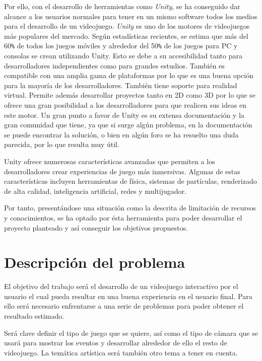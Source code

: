Por ello, con el desarrollo de herramientas como \textit{Unity}, se ha conseguido dar alcance a los usuarios normales para tener en un mismo software todos los medios para el desarrollo de un videojuego. \textit{Unity}  es uno de los motores de videojuegos más populares del mercado. Según estadísticas recientes, se estima que más del 60\verb|%| de todos los juegos móviles y alrededor del 50\verb|%| de los juegos para PC y consolas se crean utilizando Unity. Esto se debe a su accesibilidad tanto para desarrolladores independientes como para grandes estudios. También es compatible con una amplia gama de plataformas por lo que es una buena opción para la mayoría de los desarrolladores. También tiene soporte para realidad virtual. Permite además desarrollar proyectos tanto en 2D como 3D por lo que se ofrece una gran posibilidad a los desarrolladores para que realicen sus ideas en este motor. Un gran punto a favor de Unity es su extensa documentación y la gran comunidad que tiene, ya que si surge algún problema, en la documentación se puede encontrar la solución, o bien en algún foro se ha resuelto una duda parecida, por lo que resulta muy útil.

Unity ofrece numerosas características avanzadas que permiten a los desarrolladores crear experiencias de juego más inmersivas. Algunas de estas características incluyen herramientas de física, sistemas de partículas, renderizado de alta calidad, inteligencia artificial, redes y multijugador.

Por tanto, presentándose una situación como la descrita de limitación de recursos y conocimientos, se ha optado por ésta herramienta para poder desarrollar el proyecto planteado y así conseguir los objetivos propuestos.

\section{Descripción del problema}

El objetivo del trabajo será el desarrollo de un videojuego interactivo por el usuario el cual pueda resultar en una buena experiencia en el usuario final. Para ello será necesario enfrentarse a una serie de problemas para poder obtener el resultado estimado.

Será clave definir el tipo de juego que se quiere, así como el tipo de cámara que se usará para mostrar los eventos y desarrollar alrededor de ello el resto de videojuego. La temática artística será también otro tema a tener en cuenta.

